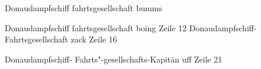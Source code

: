

Donaudampfschiff\-%
fahrtsgesellschaft bumms

Donaudampf\-schiff\-%
fahrts\-gesellschaft boing
Zeile 12
Donaudampfschiff-%
Fahrtsgesellschaft zack
Zeile 16

Donaudampfschiff-%
Fahrts"-gesellschafts-Kapitän uff
Zeile 21
